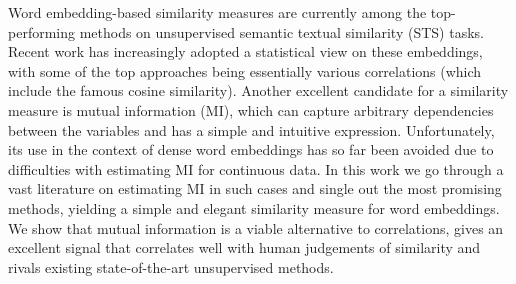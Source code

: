 Word embedding-based similarity measures are currently among the top-performing methods on unsupervised semantic textual similarity (STS) tasks. Recent work has increasingly adopted a statistical view on these embeddings, with some of the top approaches being essentially various correlations (which include the famous cosine similarity). Another excellent candidate for a similarity measure is mutual information (MI), which can capture arbitrary dependencies between the variables and has a simple and intuitive expression. Unfortunately, its use in the context of dense word embeddings has so far been avoided due to difficulties with estimating MI for continuous data. In this work we go through a vast literature on estimating MI in such cases and single out the most promising methods, yielding a simple and elegant similarity measure for word embeddings. We show that mutual information is a viable alternative to correlations, gives an excellent signal that correlates well with human judgements of similarity and rivals existing state-of-the-art unsupervised methods.
